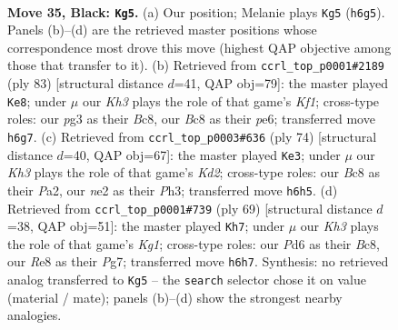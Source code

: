 \documentclass[11pt]{article}
\begin{document}
\clearpage

\begin{figure}[p]\centering
\begin{subfigure}{0.46\textwidth}\centering
\resizebox{\linewidth}{!}{%
\newchessgame
\chessboard[
  setfen={2b1r3/p7/Pr1p1R1k/2pB4/2P5/6P1/4N2K/R7 b - - 0 35},
  showmover=false,
  pgfstyle=straightmove, color=movearrow, markmove={h6-g5}
]}
\caption{}
\end{subfigure}\hfill
\begin{subfigure}{0.46\textwidth}\centering
\resizebox{\linewidth}{!}{%
\newchessgame
\chessboard[
  setfen={2b2k2/7p/4PRpP/2r5/p2Np3/8/2P5/2K5 b - - 0 42},
  showmover=false,
  pgfstyle=straightmove, color=movearrow, markmove={f8-e8}
]}
\caption{}
\end{subfigure}
\\[4pt]
\begin{subfigure}{0.46\textwidth}\centering
\resizebox{\linewidth}{!}{%
\newchessgame
\chessboard[
  setfen={4r3/2R1Bpk1/2b3p1/R2p4/3r3p/5P1P/P2K2P1/8 w - - 10 38},
  showmover=false,
  pgfstyle=straightmove, color=movearrow, markmove={d2-e3}
]}
\caption{}
\end{subfigure}\hfill
\begin{subfigure}{0.46\textwidth}\centering
\resizebox{\linewidth}{!}{%
\newchessgame
\chessboard[
  setfen={r1b2Rk1/6p1/7p/p1B1r3/2P5/1R5P/6PK/8 b - - 1 35},
  showmover=false,
  pgfstyle=straightmove, color=movearrow, markmove={g8-h7}
]}
\caption{}
\end{subfigure}
\caption{\textbf{Move 35, Black: \texttt{Kg5}.} (a) Our position; Melanie plays \texttt{Kg5} (\texttt{h6g5}). Panels (b)--(d) are the retrieved master positions whose correspondence most drove this move (highest QAP objective among those that transfer to it). (b) Retrieved from \texttt{ccrl\_top\_p0001\#2189} (ply 83) [structural distance $d$=41, QAP obj=79]: the master played \texttt{Ke8}; under $\mu$ our \emph{Kh3} plays the role of that game's \emph{Kf1}; cross-type roles: our \emph{p}g3 as their \emph{B}c8, our \emph{B}c8 as their \emph{p}e6; transferred move \texttt{h6g7}. (c) Retrieved from \texttt{ccrl\_top\_p0003\#636} (ply 74) [structural distance $d$=40, QAP obj=67]: the master played \texttt{Ke3}; under $\mu$ our \emph{Kh3} plays the role of that game's \emph{Kd2}; cross-type roles: our \emph{B}c8 as their \emph{P}a2, our \emph{n}e2 as their \emph{P}h3; transferred move \texttt{h6h5}. (d) Retrieved from \texttt{ccrl\_top\_p0001\#739} (ply 69) [structural distance $d$=38, QAP obj=51]: the master played \texttt{Kh7}; under $\mu$ our \emph{Kh3} plays the role of that game's \emph{Kg1}; cross-type roles: our \emph{P}d6 as their \emph{B}c8, our \emph{R}e8 as their \emph{P}g7; transferred move \texttt{h6h7}. Synthesis: no retrieved analog transferred to \texttt{Kg5} -- the \texttt{search} selector chose it on value (material / mate); panels (b)--(d) show the strongest nearby analogies.}
\label{fig:thought-m69}
\end{figure}
\end{document}
